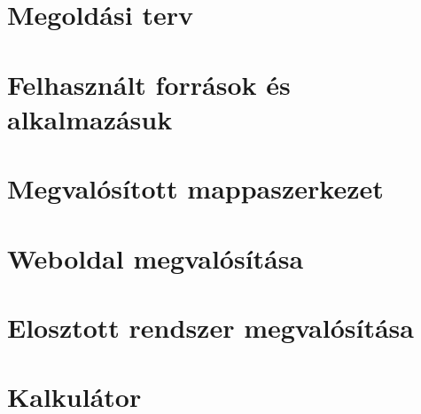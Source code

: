 \begin{comment}
-------------------------------------------------------
A Fejlesztői dokumentáció tartalmazza
- a probléma részletes specifikációját,
- a felhasznált módszerek részletes leírását, a használt fogalmak definícióját,
- a program logikai és fizikai szerkezetének leírását (adatszerkezetek, adatbázisok,
modulfelbontás),
- a tesztelési tervet és a tesztelés eredményeit.
-------------------------------------------------------
\end{comment}

\section{Megoldási terv}


\section{Felhasznált források és alkalmazásuk}


\section{Megvalósított mappaszerkezet}


\section{Weboldal megvalósítása}


\section{Elosztott rendszer  megvalósítása}


\section{Kalkulátor}



